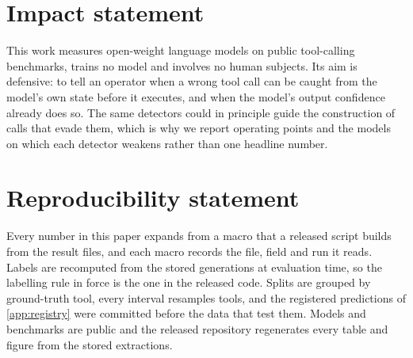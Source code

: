 \documentclass{article}
\theoremstyle{plain}
\theoremstyle{remark}
\theoremstyle{definition}
\begin{document}










\section*{Impact statement}
This work measures open-weight language models on public tool-calling benchmarks, trains no model and involves no human subjects. Its aim is defensive: to tell an operator when a wrong tool call can be caught from the model's own state before it executes, and when the model's output confidence already does so. The same detectors could in principle guide the construction of calls that evade them, which is why we report operating points and the models on which each detector weakens rather than one headline number.

\section*{Reproducibility statement}
Every number in this paper expands from a macro that a released script builds from the result files, and each macro records the file, field and run it reads. Labels are recomputed from the stored generations at evaluation time, so the labelling rule in force is the one in the released code. Splits are grouped by ground-truth tool, every interval resamples tools, and the registered predictions of \cref{app:registry} were committed before the data that test them. Models and benchmarks are public and the released repository regenerates every table and figure from the stored extractions.




\appendix
\onecolumn
\makeatletter
\def\addcontentsline#1#2#3{\addtocontents{#1}{\protect\contentsline{#2}{#3}{\thepage}{}}}
\makeatother

\end{document}

